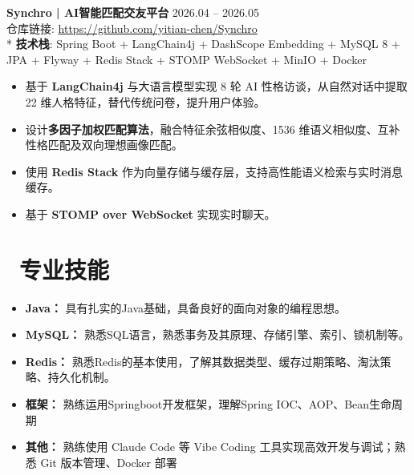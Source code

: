 \documentclass[10pt]{article}
\newlength{\intraProjectTitleSep}
\newcommand{\titlebreak}{\\[\intraProjectTitleSep]}
\newlength{\intraProjectListTopSep}
\begin{document}
\textbf{Synchro | AI智能匹配交友平台} \hfill 2026.04 -- 2026.05 \titlebreak
{\small 仓库链接: \color{CVBlue}\href{https://github.com/yitian-chen/Synchro}{https://github.com/yitian-chen/Synchro}}\\*
\textbf{技术栈}: Spring Boot + LangChain4j + DashScope Embedding + MySQL 8 + JPA + Flyway + Redis Stack + STOMP WebSocket + MinIO + Docker
\begin{itemize}[nosep, topsep=\intraProjectListTopSep]                                
    \item 基于 \textbf{LangChain4j} 与大语言模型实现 8 轮 AI 性格访谈，从自然对话中提取 22 维人格特征，替代传统问卷，提升用户体验。
    
    \item 设计\textbf{多因子加权匹配算法}，融合特征余弦相似度、1536 维语义相似度、互补性格匹配及双向理想画像匹配。
    
    \item 使用 \textbf{Redis Stack} 作为向量存储与缓存层，支持高性能语义检索与实时消息缓存。
    
    \item 基于 \textbf{STOMP over WebSocket} 实现实时聊天。
    
\end{itemize}


\section{\makebox[\widthof{\faCogs}][c]{\color{CVBlue}\faCogs}\ 专业技能}
\begin{itemize}[nosep]
    \item \textbf{Java：} 具有扎实的Java基础，具备良好的面向对象的编程思想。
    \item \textbf{MySQL：} 熟悉SQL语言，熟悉事务及其原理、存储引擎、索引、锁机制等。
    \item \textbf{Redis：} 熟悉Redis的基本使用，了解其数据类型、缓存过期策略、淘汰策略、持久化机制。
    \item \textbf{框架：} 熟练运用Springboot开发框架，理解Spring IOC、AOP、Bean生命周期
    \item \textbf{其他：} 熟练使用 Claude Code 等 Vibe Coding 工具实现高效开发与调试；熟悉 Git 版本管理、Docker 部署
\end{itemize}


    
\end{document}
